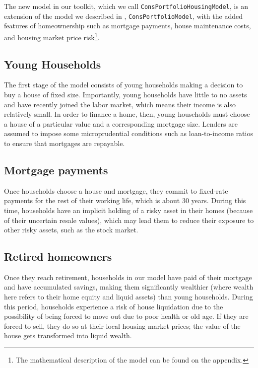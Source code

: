 \documentclass[PortfolioChoiceWithRiskyHousing]{subfiles}
\begin{document}
The new model in our toolkit, which we call \texttt{ConsPortfolioHousingModel}, is an extension of the model we described in \cite{Carroll2020}, \texttt{ConsPortfolioModel}, with the added features of homeownership such as mortgage payments, house maintenance costs, and housing market price risk\footnote{The mathematical description of the model can be found on the appendix.}.

\subsection{Young Households}

The first stage of the model consists of young households making a decision to buy a house of fixed size. Importantly, young households have little to no assets and have recently joined the labor market, which means their income is also relatively small. In order to finance a home, then, young households must choose a house of a particular value and a corresponding mortgage size. Lenders are assumed to impose some microprudential conditions such as loan-to-income ratios to ensure that mortgages are repayable.

\subsection{Mortgage payments}

Once households choose a house and mortgage, they commit to fixed-rate payments for the rest of their working life, which is about 30 years. During this time, households have an implicit holding of a risky asset in their homes (because of their uncertain resale values), which may lead them to reduce their exposure to other risky assets, such as the stock market.

\subsection{Retired homeowners}

Once they reach retirement, households in our model have paid of their mortgage and have accumulated savings, making them significantly wealthier (where wealth here refers to their home equity and liquid assets) than young households. During this period, households experience a risk of house liquidation due to the possibility of being forced to move out due to poor health or old age. If they are forced to sell, they do so at their local housing market prices; the value of the house gets transformed into liquid wealth.
\end{document}
